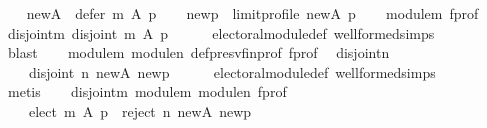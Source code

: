 \begin{isabellebody}
\ \ \isamarkupfalse%
\ {\isacharquery}{\kern0pt}new{\isacharunderscore}{\kern0pt}A\ {\isacharequal}{\kern0pt}\ {\isachardoublequoteopen}defer\ m\ A\ p{\isachardoublequoteclose}\isanewline
\ \ \isamarkupfalse%
\ {\isacharquery}{\kern0pt}new{\isacharunderscore}{\kern0pt}p\ {\isacharequal}{\kern0pt}\ {\isachardoublequoteopen}limit{\isacharunderscore}{\kern0pt}profile\ {\isacharquery}{\kern0pt}new{\isacharunderscore}{\kern0pt}A\ p{\isachardoublequoteclose}\isanewline
\ \ \isamarkupfalse%
\ module{\isacharunderscore}{\kern0pt}m\ f{\isacharunderscore}{\kern0pt}prof\ \isamarkupfalse%
\ disjoint{\isacharunderscore}{\kern0pt}m{\isacharcolon}{\kern0pt}\ {\isachardoublequoteopen}disjoint{}\ {\isacharparenleft}{\kern0pt}m\ A\ p{\isacharparenright}{\kern0pt}{\isachardoublequoteclose}\isanewline
\ \ \ \ \isamarkupfalse%
\ electoral{\isacharunderscore}{\kern0pt}module{\isacharunderscore}{\kern0pt}def\ well{\isacharunderscore}{\kern0pt}formed{\isachardot}{\kern0pt}simps\isanewline
\ \ \ \ \isamarkupfalse%
\ blast\isanewline
\ \ \isamarkupfalse%
\ module{\isacharunderscore}{\kern0pt}m\ module{\isacharunderscore}{\kern0pt}n\ def{\isacharunderscore}{\kern0pt}presv{\isacharunderscore}{\kern0pt}fin{\isacharunderscore}{\kern0pt}prof\ f{\isacharunderscore}{\kern0pt}prof\ \isamarkupfalse%
\ disjoint{\isacharunderscore}{\kern0pt}n{\isacharcolon}{\kern0pt}\isanewline
\ \ \ \ {\isachardoublequoteopen}{\isacharparenleft}{\kern0pt}disjoint{}\ {\isacharparenleft}{\kern0pt}n\ {\isacharquery}{\kern0pt}new{\isacharunderscore}{\kern0pt}A\ {\isacharquery}{\kern0pt}new{\isacharunderscore}{\kern0pt}p{\isacharparenright}{\kern0pt}{\isacharparenright}{\kern0pt}{\isachardoublequoteclose}\isanewline
\ \ \ \ \isamarkupfalse%
\ electoral{\isacharunderscore}{\kern0pt}module{\isacharunderscore}{\kern0pt}def\ well{\isacharunderscore}{\kern0pt}formed{\isachardot}{\kern0pt}simps\isanewline
\ \ \ \ \isamarkupfalse%
\ metis\isanewline
\ \ \isamarkupfalse%
\ disjoint{\isacharunderscore}{\kern0pt}m\ module{\isacharunderscore}{\kern0pt}m\ module{\isacharunderscore}{\kern0pt}n\ f{\isacharunderscore}{\kern0pt}prof\ \isamarkupfalse%
\ {}{\isacharcolon}{\kern0pt}\isanewline
\ \ \ \ {\isachardoublequoteopen}{\isacharparenleft}{\kern0pt}elect\ m\ A\ p\ {\isasyminter}\ reject\ n\ {\isacharquery}{\kern0pt}new{\isacharunderscore}{\kern0pt}A\ {\isacharquery}{\kern0pt}new{\isacharunderscore}{\kern0pt}p{\isacharparenright}{\kern0pt}\ {\isacharequal}{\kern0pt}\ {\isacharbraceleft}{\kern0pt}{\isacharbraceright}{\kern0pt}{\isachardoublequoteclose}\isanewline

\end{isabellebody}
